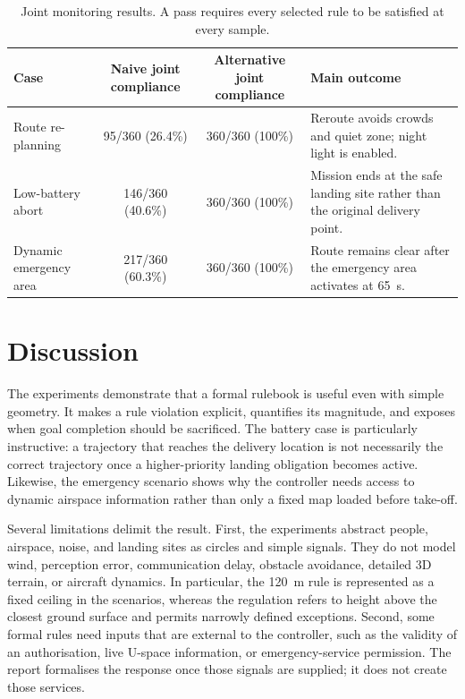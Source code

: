 \documentclass[11pt,a4paper]{article}
\begin{document}
\begin{table}[htbp]
\centering
\caption{Joint monitoring results. A pass requires every selected rule to be satisfied at every sample.}
\label{tab:results}
\small
\begin{tabularx}{\linewidth}{@{}Y c c Y@{}}
\toprule
Case & Naive joint compliance & Alternative joint compliance & Main outcome \\
\midrule
Route re-planning & 95/360 (26.4\%) & 360/360 (100\%) & Reroute avoids crowds and quiet zone; night light is enabled. \\
Low-battery abort & 146/360 (40.6\%) & 360/360 (100\%) & Mission ends at the safe landing site rather than the original delivery point. \\
Dynamic emergency area & 217/360 (60.3\%) & 360/360 (100\%) & Route remains clear after the emergency area activates at 65~s. \\
\bottomrule
\end{tabularx}
\end{table}

\section{Discussion}

The experiments demonstrate that a formal rulebook is useful even with simple geometry. It makes a rule violation explicit, quantifies its magnitude, and exposes when goal completion should be sacrificed. The battery case is particularly instructive: a trajectory that reaches the delivery location is not necessarily the correct trajectory once a higher-priority landing obligation becomes active. Likewise, the emergency scenario shows why the controller needs access to dynamic airspace information rather than only a fixed map loaded before take-off.

Several limitations delimit the result. First, the experiments abstract people, airspace, noise, and landing sites as circles and simple signals. They do not model wind, perception error, communication delay, obstacle avoidance, detailed 3D terrain, or aircraft dynamics. In particular, the 120~m rule is represented as a fixed ceiling in the scenarios, whereas the regulation refers to height above the closest ground surface and permits narrowly defined exceptions. Second, some formal rules need inputs that are external to the controller, such as the validity of an authorisation, live U-space information, or emergency-service permission. The report formalises the response once those signals are supplied; it does not create those services.
\end{document}
